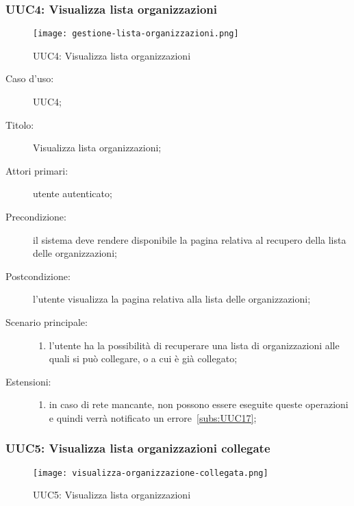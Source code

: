 \documentclass[../../../analisi-dei-requisiti.tex]{subfiles}
\begin{document}
\subsubsection{UUC4: Visualizza lista organizzazioni}%
\label{subs:UUC4}


\begin{figure}[H]
  \centering
  \texttt{[image: gestione-lista-organizzazioni.png]}
  \caption{UUC4: Visualizza lista organizzazioni}%
  \label{fig:UUC4}
\end{figure}

\begin{description}
  \item[Caso d'uso:] UUC4;
  \item[Titolo:] Visualizza lista organizzazioni;
  \item[Attori primari:] utente autenticato;
  \item[Precondizione:] il sistema deve rendere disponibile la pagina relativa al recupero della lista delle organizzazioni;
  \item[Postcondizione:] l'utente visualizza la pagina relativa alla lista delle organizzazioni;
  \item[Scenario principale:]
        \begin{enumerate}
          \item l'utente ha la possibilità di recuperare una lista di organizzazioni alle quali si può collegare, o a cui è già collegato;
        \end{enumerate}
  \item[Estensioni:]
        \begin{enumerate}
          \item in caso di rete mancante, non possono essere eseguite queste operazioni e quindi verrà notificato un errore~\ref{subs:UUC17};
        \end{enumerate}
\end{description}



\subsubsection{UUC5: Visualizza lista organizzazioni collegate}%
\label{subs:UUC5}

\begin{figure}[H]
  \centering
  \texttt{[image:  visualizza-organizzazione-collegata.png]}
  \caption{UUC5: Visualizza lista organizzazioni}%
  \label{fig:UUC5}
\end{figure}
\end{document}

